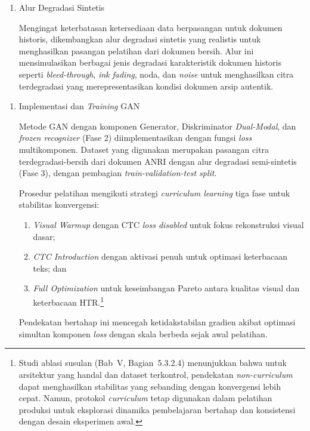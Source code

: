 \begin{enumerate}[label=Fase \arabic*, wide=0pt, itemsep=1em, resume]
    \item Alur Degradasi Sintetis
    
    Mengingat keterbatasan ketersediaan data berpasangan untuk dokumen historis, dikembangkan alur degradasi sintetis yang realistis untuk menghasilkan pasangan pelatihan dari dokumen bersih. Alur ini mensimulasikan berbagai jenis degradasi karakteristik dokumen historis seperti \textit{bleed-through}, \textit{ink fading}, noda, dan \textit{noise} untuk menghasilkan citra terdegradasi yang merepresentasikan kondisi dokumen arsip autentik.
\end{enumerate}

\begin{enumerate}[label=Fase \arabic*, wide=0pt, itemsep=1em, resume]
    \item Implementasi dan \textit{Training} GAN
    
    Metode GAN dengan komponen Generator, Diskriminator \textit{Dual-Modal}, dan \textit{frozen recognizer} (Fase 2) diimplementasikan dengan fungsi \textit{loss} multikomponen. Dataset yang digunakan merupakan pasangan citra terdegradasi-bersih dari dokumen ANRI dengan alur degradasi semi-sintetis (Fase 3), dengan pembagian \textit{train-validation-test split}.

    Prosedur pelatihan mengikuti strategi \textit{curriculum learning} tiga fase untuk stabilitas konvergensi:
    \begin{enumerate}[label=(\arabic*), leftmargin=*, nosep]
        \item \textit{Visual Warmup} dengan CTC \textit{loss disabled} untuk fokus rekonstruksi visual dasar;
        \item \textit{CTC Introduction} dengan aktivasi penuh untuk optimasi keterbacaan teks; dan
        \item \textit{Full Optimization} untuk keseimbangan Pareto antara kualitas visual dan keterbacaan HTR.\footnote{Studi ablasi susulan (Bab~V, Bagian~5.3.2.4) menunjukkan bahwa untuk arsitektur yang handal dan dataset terkontrol, pendekatan \textit{non-curriculum} dapat menghasilkan stabilitas yang sebanding dengan konvergensi lebih cepat. Namun, protokol \textit{curriculum} tetap digunakan dalam pelatihan produksi untuk eksplorasi dinamika pembelajaran bertahap dan konsistensi dengan desain eksperimen awal.}
    \end{enumerate}
    Pendekatan bertahap ini mencegah ketidakstabilan gradien akibat optimasi simultan komponen \textit{loss} dengan skala berbeda sejak awal pelatihan.


\end{enumerate}
